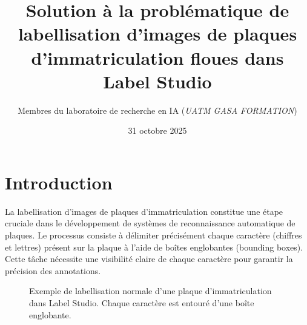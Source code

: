 \documentclass[twocolumn]{el-author}
\date{31 octobre 2025}
\begin{document}
\title{Solution à la problématique de labellisation d'images de plaques d'immatriculation floues dans Label Studio}

\author{Membres du laboratoire de recherche en IA (\textit{UATM GASA FORMATION})}


\maketitle

\section{Introduction}

La labellisation d'images de plaques d'immatriculation constitue une étape cruciale dans le développement de systèmes de reconnaissance automatique de plaques. Le processus consiste à délimiter précisément chaque caractère (chiffres et lettres) présent sur la plaque à l'aide de boîtes englobantes (bounding boxes). Cette tâche nécessite une visibilité claire de chaque caractère pour garantir la précision des annotations.

\begin{figure}[h]
\caption{Exemple de labellisation normale d'une plaque d'immatriculation dans Label Studio. Chaque caractère est entouré d'une boîte englobante.}
\end{figure}
\end{document}
